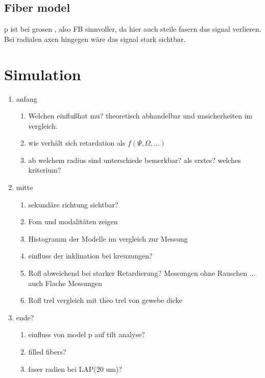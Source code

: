 \subsection{Fiber model}
% 
p ist bei grosen , also FB sinnvoller, da hier auch steile fasern das signal verlieren. Bei radialen axen hingegen wäre das signal stark sichtbar.
% 
% 
% 
\newpage
% 
\section{Simulation}
% 
\begin{enumerate}
\item anfang
    \begin{enumerate}
    \item Welchen einflu\ss hat mu? theoretisch abhandelbar und unsicherheiten im vergleich.
    \item wie verh\"alt sich retardation als $f(\Psi, \Omega, ...)$
    \item ab welchem radius sind unterschiede bemerkbar? als erstes? welches kriterium?
    \end{enumerate}
% 
\item mitte
    \begin{enumerate}
    \item sekund\"are richtung sichtbar?
    \item Fom und modalit\"aten zeigen
    \item Histogramm der Modelle im vergleich zur Messung
    \item einfluss der inklination bei kreuzungen?
    \item Rofl abweichend bei starker Retardierung? Messungen ohne Rauschen ... auch Flache Messungen
    \item Rofl trel vergleich mit theo trel von gewebe dicke
    \end{enumerate}
% 
\item ende?
    \begin{enumerate}
    \item einfluss von model p auf tilt analyse?
    \item filled fibers?
    \item faser radien bei LAP(20 um)?
    \end{enumerate}
\end{enumerate}
% 
% 
% 
